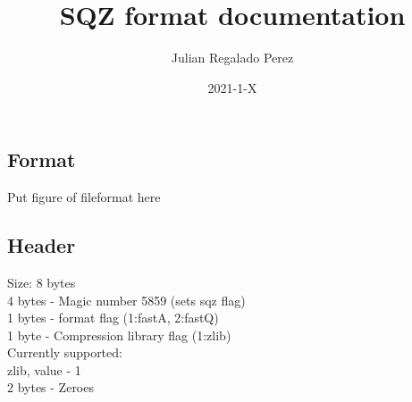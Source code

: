 \documentclass{article}
\title{SQZ format documentation}
\date{2021-1-X}
\author{Julian Regalado Perez}
\begin{document}
    \pagestyle{fancy}
    \maketitle
    \newpage

    \section*{}
    \subsection*{Format}
    Put figure of fileformat here
    \subsection*{Header}
    Size: 8 bytes
    \\4 bytes - Magic number 5859 (sets sqz flag)
    \\1 bytes - format flag (1:fastA, 2:fastQ)
    \\1 byte  - Compression library flag (1:zlib)
    \\\indent Currently supported:
    \\\indent\indent zlib, value - 1
    \\2 bytes - Zeroes
\end{document}
